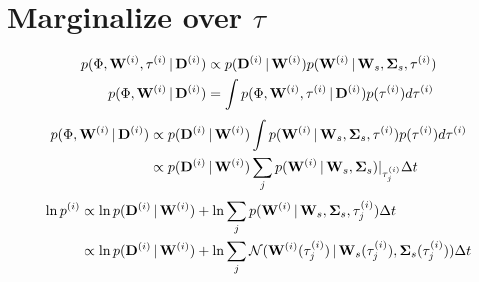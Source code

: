 \documentclass[letterpaper,12pt,preprint]{aastex}
\newcommand{\given}{\,|\,}
\newcommand{\D}{{\bf D}}
\newcommand{\W}{{\bf W}}
\newcommand{\bSigma}{{\bf \Sigma}}
\begin{document}

\section{Marginalize over $\tau$}
\begin{align}
	p(\Phi, \W^{(i)}, \tau^{(i)} \given \D^{(i)}) &\propto 
		p(\D^{(i)} \given \W^{(i)}) p(\W^{(i)} \given \W_s, \bSigma_s, \tau^{(i)})\\
	p(\Phi, \W^{(i)} \given \D^{(i)}) &= \int p(\Phi, \W^{(i)}, \tau^{(i)} \given \D^{(i)}) p(\tau^{(i)}) d\tau^{(i)}
\end{align}	
\begin{align}
	p(\Phi, \W^{(i)} \given \D^{(i)}) &\propto p(\D^{(i)} \given \W^{(i)}) \int p(\W^{(i)} \given \W_s, \bSigma_s, \tau^{(i)}) p(\tau^{(i)}) d\tau^{(i)}\\
	&\propto p(\D^{(i)} \given \W^{(i)}) \sum_j p(\W^{(i)} \given \W_s, \bSigma_s)|_{\tau^{(i)}_j} \Delta t
\end{align}
\begin{align}
	\ln p^{(i)} &\propto \ln p(\D^{(i)} \given \W^{(i)}) + \ln \sum_j p(\W^{(i)} \given \W_s, \bSigma_s, \tau^{(i)}_j) \Delta t\\
	&\propto \ln p(\D^{(i)} \given \W^{(i)}) + \ln \sum_j \mathcal{N}(\W^{(i)}( \tau^{(i)}_j) \given \W_s( \tau^{(i)}_j), \bSigma_s( \tau^{(i)}_j)) \Delta t\\
\end{align}
\end{document}
